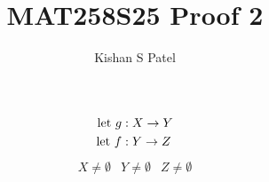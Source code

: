 \documentclass{exam}
\theoremstyle{plain}
\theoremstyle{definition}
\begin{document}
\title{MAT258S25 Proof 2}
\author{Kishan S Patel}
\maketitle

\renewcommand{\qedsymbol}{QED}

\begin{align*}
	{\text{let } } g & : X \to Y \\
	{\text{let } } f & : Y \to Z
\end{align*}
$$ \begin{matrix}
		X  \neq \emptyset &
		Y  \neq \emptyset &
		Z  \neq \emptyset
	\end{matrix}$$

\begin{questions}
	
	
\end{questions}
\end{document}
